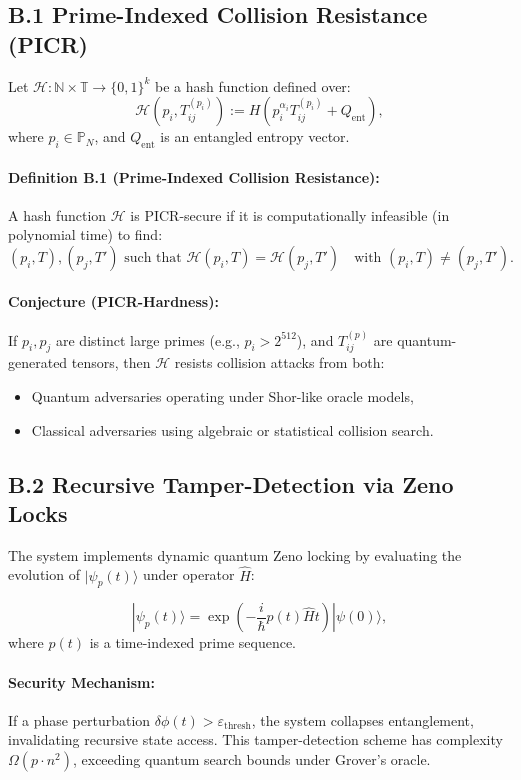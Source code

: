 \documentclass[12pt]{article}
\begin{document}
\begin{itemize}
\subsection*{B.1 Prime-Indexed Collision Resistance (PICR)}

Let \(\mathcal{H} : \mathbb{N} \times \mathbb{T} \to \{0,1\}^k\) be a hash function defined over:
\[
\mathcal{H}(p_i, T_{ij}^{(p_i)}) := H(p_i^{\alpha_i} T_{ij}^{(p_i)} + Q_{\text{ent}}),
\]
where \(p_i \in \mathbb{P}_N\), and \(Q_{\text{ent}}\) is an entangled entropy vector.

\paragraph{Definition B.1 (Prime-Indexed Collision Resistance):}
A hash function \(\mathcal{H}\) is PICR-secure if it is computationally infeasible (in polynomial time) to find:
\[
(p_i, T), (p_j, T') \text{ such that } \mathcal{H}(p_i, T) = \mathcal{H}(p_j, T') \quad \text{with } (p_i, T) \ne (p_j, T').
\]

\paragraph{Conjecture (PICR-Hardness):}
If \(p_i, p_j\) are distinct large primes (e.g., \(p_i > 2^{512}\)), and \(T_{ij}^{(p)}\) are quantum-generated tensors, then \(\mathcal{H}\) resists collision attacks from both:
\begin{itemize}
    \item Quantum adversaries operating under Shor-like oracle models,
    \item Classical adversaries using algebraic or statistical collision search.
\end{itemize}

\subsection*{B.2 Recursive Tamper-Detection via Zeno Locks}

The system implements dynamic quantum Zeno locking by evaluating the evolution of \(|\psi_p(t)\rangle\) under operator \(\hat{H}\):

\[
|\psi_p(t)\rangle = \exp\left(-\frac{i}{\hbar} p(t) \hat{H} t\right) |\psi(0)\rangle,
\]
where \(p(t)\) is a time-indexed prime sequence.

\paragraph{Security Mechanism:}
If a phase perturbation \(\delta \phi(t) > \varepsilon_{\text{thresh}}\), the system collapses entanglement, invalidating recursive state access. This tamper-detection scheme has complexity \(\Omega(p \cdot n^2)\), exceeding quantum search bounds under Grover’s oracle.


\end{itemize}
\end{document}
